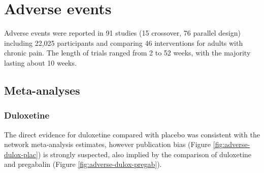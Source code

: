 \documentclass{report}\usepackage[]{graphicx}\usepackage[]{color}
\begin{document}
\section{Adverse events}


Adverse events were reported in 91 studies (15 crossover, 76 parallel design) including 22,025 participants and comparing 46 interventions for adults with chronic pain. The length of trials ranged from 2 to 52 weeks, with the majority lasting about 10 weeks.



\subsection{Meta-analyses}

\subsubsection{Duloxetine}

The direct evidence for duloxetine compared with placebo was consistent with the network meta-analysis estimates, however publication bias (Figure \ref{fig:adverse-dulox-plac}) is strongly suspected, also implied by the comparison of duloxetine and pregabalin (Figure \ref{fig:adverse-dulox-pregab}).
\end{document}
